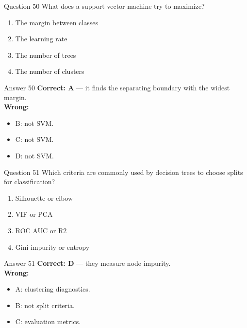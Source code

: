 \documentclass[aspectratio=169,11pt]{beamer}
\begin{document}
\begin{frame}{Question 50}
What does a support vector machine try to maximize?
\begin{enumerate}[label=\Alph*.]
\item The margin between classes
\item The learning rate
\item The number of trees
\item The number of clusters
\end{enumerate}
\end{frame}
\begin{frame}{Answer 50}
\textbf{Correct: A} --- it finds the separating boundary with the widest margin.\\
\vspace{0.5em}
\textbf{Wrong:}
\begin{itemize}
\item B: not SVM.
\item C: not SVM.
\item D: not SVM.
\end{itemize}
\end{frame}

\begin{frame}{Question 51}
Which criteria are commonly used by decision trees to choose splits for classification?
\begin{enumerate}[label=\Alph*.]
\item Silhouette or elbow
\item VIF or PCA
\item ROC AUC or R2
\item Gini impurity or entropy
\end{enumerate}
\end{frame}
\begin{frame}{Answer 51}
\textbf{Correct: D} --- they measure node impurity.\\
\vspace{0.5em}
\textbf{Wrong:}
\begin{itemize}
\item A: clustering diagnostics.
\item B: not split criteria.
\item C: evaluation metrics.
\end{itemize}
\end{frame}
\end{document}

